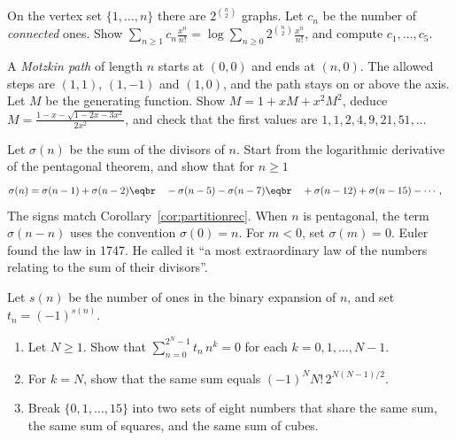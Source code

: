 \begin{exercise}[$\star\star$]\label{ex:connected}
On the vertex set $\{1,\dots,n\}$ there are $2^{\binom n2}$ graphs. Let $c_n$ be the number of \emph{connected}
ones. Show $\sum_{n\ge1}c_n\frac{x^n}{n!}=\log\sum_{n\ge0}2^{\binom n2}\frac{x^n}{n!}$, and compute $c_1,\dots,c_5$.
\end{exercise}

\begin{exercise}[$\star$]\label{ex:motzkin}
A \emph{Motzkin path} of length $n$ starts at $(0,0)$ and ends at $(n,0)$. The allowed steps are $(1,1)$, $(1,-1)$ and $(1,0)$, and the path stays on or above the
axis. Let $M$ be the generating function. Show $M=1+xM+x^2M^2$, deduce $M=\frac{1-x-\sqrt{1-2x-3x^2}}{2x^2}$, and
check that the first values are $1,1,2,4,9,21,51,\dots$
\end{exercise}

\begin{exercise}[$\star\star\star$]\label{ex:sigma}
Let $\sigma(n)$ be the sum of the divisors of $n$. Start from the logarithmic derivative of the pentagonal theorem, and show
that for $n\ge1$
\[
\begin{aligned}\sigma(n)&=\sigma(n-1)+\sigma(n-2)\eqbr\quad-\sigma(n-5)-\sigma(n-7)\eqbr\quad+\sigma(n-12)+\sigma(n-15)-\cdots,\end{aligned}
\]
The signs match Corollary~\ref{cor:partitionrec}. When $n$ is pentagonal, the term $\sigma(n-n)$ uses the convention $\sigma(0)=n$. For $m<0$, set $\sigma(m)=0$. Euler found the law in 1747. He called it ``a most extraordinary law of the
numbers relating to the sum of their divisors''.
\end{exercise}

\begin{exercise}[$\star\star$]\label{pb:prouhet}
Let $s(n)$ be the number of ones in the binary expansion of $n$, and set $t_n=(-1)^{s(n)}$.
\begin{enumerate}[label=(\alph*)]
\item Let $N\ge1$. Show that $\sum_{n=0}^{2^N-1}t_n\,n^k=0$ for each $k=0,1,\dots,N-1$.
\item For $k=N$, show that the same sum equals $(-1)^NN!\,2^{N(N-1)/2}$.
\item Break $\{0,1,\dots,15\}$ into two sets of eight numbers that share the same sum, the same sum of squares, and the same sum
of cubes.
\end{enumerate}
\end{exercise}

